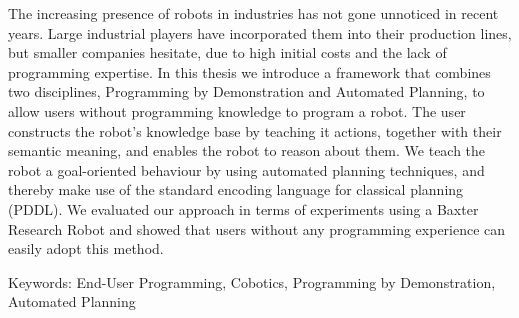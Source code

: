 The increasing presence of robots in industries has not gone unnoticed in recent years. 
Large industrial players have incorporated them into their production lines, but smaller companies hesitate, due to high initial costs and the lack of programming expertise. 
In this thesis we introduce a framework that combines two disciplines, Programming by Demonstration and Automated Planning, to allow users without programming knowledge to program a robot. 
The user constructs the robot's knowledge base by teaching it actions, together with their semantic meaning, and enables the robot to reason about them. 
We teach the robot a goal-oriented behaviour by using automated planning techniques, and thereby make use of the standard encoding language for classical planning (PDDL).
We evaluated our approach in terms of experiments using a Baxter Research Robot and showed that users without any programming experience can easily adopt this method.

Keywords: End-User Programming, Cobotics, Programming by Demonstration, Automated Planning